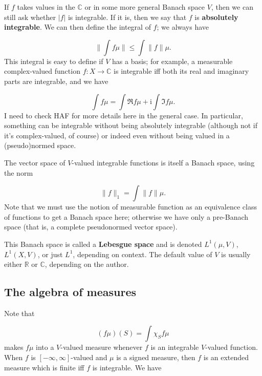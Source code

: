 \documentclass[preprint, 5p, 10pt]{elsarticle}
\theoremstyle{plain}
\begin{document}
If $f$ takes values in the $\mathbb{C}$ or in some more general Banach space $V$, then we can still ask whether $|f|$ is integrable. If it is, then we say that $f$ is \textbf{absolutely integrable}. We can then define the integral of $f$; we always have

\begin{displaymath}
\| \int f \mu \| \leq \int \|f\| \mu .
\end{displaymath}
This integral is easy to define if $V$ has a basis; for example, a measurable complex-valued function $f: X \to \mathbb{C}$ is integrable iff both its real and imaginary parts are integrable, and we have

\begin{displaymath}
\int f \mu = \int \Re{f} \mu + \mathrm{i} \int \Im{f} \mu .
\end{displaymath}
I need to check HAF for more details here in the general case. In particular, something can be integrable without being absolutely integrable (although not if it'{}s complex-valued, of course) or indeed even without being valued in a (pseudo)normed space.

The vector space of $V$-valued integrable functions is itself a Banach space, using the norm

\begin{displaymath}
\|f\|_1 = \int \|f\| \mu .
\end{displaymath}
Note that we must use the notion of measurable function as an equivalence class of functions to get a Banach space here; otherwise we have only a pre-Banach space (that is, a complete pseudonormed vector space).

This Banach space is called a \textbf{Lebesgue space} and is denoted $L^1(\mu,V)$, $L^1(X,V)$, or just $L^1$, depending on context. The default value of $V$ is usually either $\mathbb{R}$ or $\mathbb{C}$, depending on the author.

\hypertarget{the_algebra_of_measures_11}{}\subsection*{{The algebra of measures}}\label{the_algebra_of_measures_11}

Note that

\begin{displaymath}
(f \mu) (S) = \int \chi_S f \mu
\end{displaymath}
makes $f \mu$ into a $V$-valued measure whenever $f$ is an integrable $V$-valued function. When $f$ is $[-\infty,\infty]$-valued and $\mu$ is a signed measure, then $f$ is an extended measure which is finite iff $f$ is integrable. We have
\end{document}
